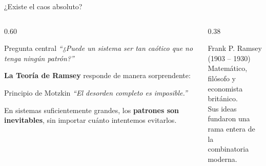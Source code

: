 
\begin{frame}{¿Existe el caos absoluto?}

    \begin{columns}[T]

        \begin{column}{0.60\textwidth}
            \vspace{0.2cm}
            \begin{exampleblock}{\centering Pregunta central}
                \centering
                \textit{``¿Puede un sistema ser tan caótico que no tenga ningún patrón?''}
            \end{exampleblock}

            \vspace{0.4cm}

            \textbf{La Teoría de Ramsey} responde de manera sorprendente:

            \vspace{0.2cm}

            \begin{alertblock}{\centering Principio de Motzkin}
                \centering
                \Large\textit{``El desorden completo es imposible.''}
            \end{alertblock}

            \vspace{0.3cm}

            En sistemas suficientemente grandes, los \textbf{patrones
            son inevitables}, sin importar cuánto intentemos evitarlos.
        \end{column}

        \begin{column}{0.38\textwidth}
            \begin{block}{Frank P. Ramsey}
                \centering
                (1903 -- 1930)\\[4pt]
                Matemático, filósofo y\\ economista británico.\\[6pt]
                Sus ideas fundaron una\\ rama entera de la\\ combinatoria moderna.
            \end{block}
        \end{column}

    \end{columns}

\end{frame}



